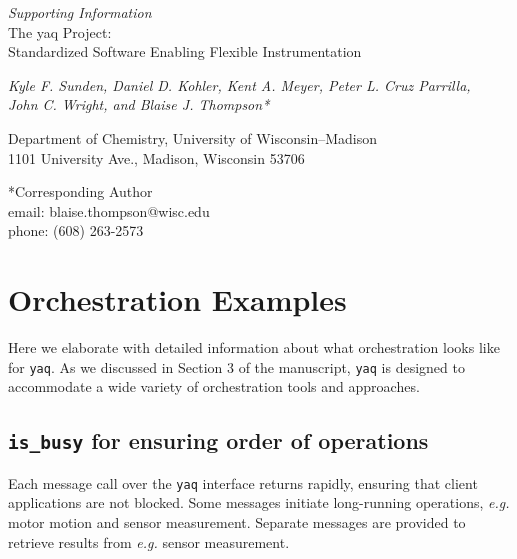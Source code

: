 \documentclass[11pt, full]{article}
\newcommand\yaq{\texttt{yaq}}
\renewcommand{\thefigure}{S\arabic{figure}}
\let\stdsection\section
\renewcommand\section{\clearpage\stdsection}
\begin{document}

\begin{center}
  \LARGE

  \textit{Supporting Information} \\
  The yaq Project: \\
  Standardized Software Enabling Flexible Instrumentation

  \normalsize

  \textit{Kyle F. Sunden, Daniel D. Kohler, Kent A. Meyer, Peter L. Cruz Parrilla, \\
    John C. Wright, and Blaise J. Thompson*}

  Department of Chemistry, University of Wisconsin--Madison\\
  1101 University Ave., Madison, Wisconsin 53706
\end{center}

\vspace{\fill}

*Corresponding Author \\
\hspace*{2ex} email: blaise.thompson@wisc.edu \\
\hspace*{2ex} phone: (608) 263-2573

\pagebreak
\setcounter{page}{1}
\renewcommand{\thepage}{S\arabic{page}}
\renewcommand{\thefigure}{S\arabic{figure}}

\pagebreak
\renewcommand{\baselinestretch}{0.75}\normalsize
\tableofcontents
\renewcommand{\baselinestretch}{1.0}\normalsize

\section{Orchestration Examples}

Here we elaborate with detailed information about what orchestration looks like for \yaq{}.
As we discussed in Section 3 of the manuscript, \yaq{} is designed to accommodate a wide variety of orchestration tools and approaches.

\subsection{\texttt{is\_busy} for ensuring order of operations}

Each message call over the \yaq{} interface returns rapidly, ensuring that client applications are not blocked.
Some messages initiate long-running operations, \emph{e.g.} motor motion and sensor measurement.
Separate messages are provided to retrieve results from \emph{e.g.} sensor measurement.
\end{document}
